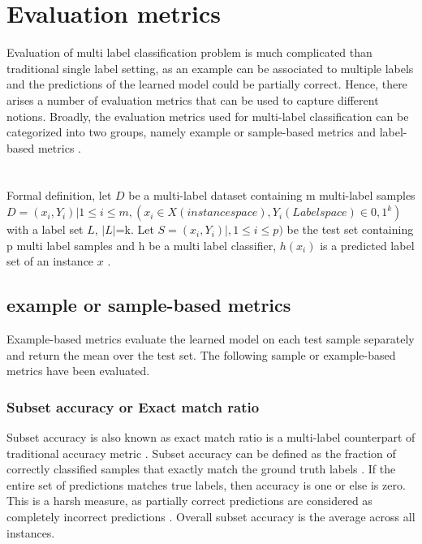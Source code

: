 \section{Evaluation metrics} \label{Evaluation_metrics}
Evaluation of multi label classification problem is much complicated than traditional single label setting, as an example can be associated to multiple labels and the predictions of the learned model could be partially correct\cite{sorower2010literature}\cite{zhang2013review}. Hence, there arises a number of evaluation metrics that can be used to capture different notions. 
Broadly, the evaluation metrics used for multi-label classification can be categorized into two groups, namely example or sample-based metrics and label-based metrics \cite{zhang2013review}.
\\

\\
\\
Formal definition, let $D$ be a multi-label dataset containing m multi-label samples $D = {(x_i,Y_i)|1\leq i \leq m}, (x_i \in X (instance space), Y_i (Label space) \in {0,1}^k)$ with a label set $L$, $|L|$=k. Let $S = {(x_i,Y_i) | ,1\leq i \leq p)}$ be the test set containing p multi label samples and h be a multi label classifier, $h(x_i)$ is a predicted label set of an instance $x$ \cite{zhang2013review}.

\subsection{example or sample-based metrics}
Example-based metrics evaluate the learned model on each test sample separately and return the mean over the test set\cite{zhang2013review}. The following sample or example-based metrics have been evaluated.
 
\subsubsection{Subset accuracy or Exact match ratio}
 Subset accuracy is also known as exact match ratio is a multi-label counterpart of traditional accuracy metric \cite{zhang2013review}. Subset accuracy can be defined as the fraction of correctly classified samples that exactly match the ground truth labels \cite{zhang2013review}. If the entire set of predictions matches true labels, then accuracy is one or else is zero. This is a harsh measure, as partially correct predictions are considered as completely incorrect predictions\cite{sorower2010literature} \cite{zhang2010multi}.  Overall subset accuracy is the average across all instances. 

